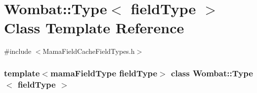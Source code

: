 \hypertarget{classWombat_1_1Type}{
\section{Wombat::Type$<$ fieldType $>$ Class Template Reference}
\label{classWombat_1_1Type}
}


{\ttfamily \#include $<$MamaFieldCacheFieldTypes.h$>$}\subsubsection*{template$<$mamaFieldType fieldType$>$ class Wombat::Type$<$ fieldType $>$}

